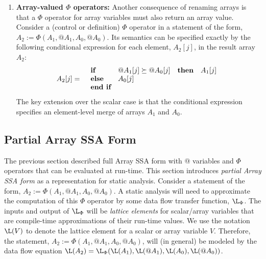 \begin{enumerate}
\item {\bf Array-valued  $\Phi$ operators:}
\label{array:phi}
Another consequence of renaming arrays is that
a $\Phi$ operator
for array variables must also return an
array value.  Consider a (control or definition) $\Phi$ operator in
a statement of
the form, $A_2 := \Phi(A_1, @A_1, A_0, @A_0)$. Its semantics can be specified exactly
by the following conditional expression
for each element, $A_2[j]$, in the result array $A_2$:
\begin{eqnarray}
A_2[j] & = &
  \begin{array}{llll}
\mbox{\bf if} & @A_1[j] \succeq @A_0[j] & {\bf then} & A_1[j] \\
\mbox{\bf else} & A_0[j] \\
\mbox{\bf end if} \label{eqn:cond-expr}
  \end{array}
\end{eqnarray}
The key extension over the scalar case is that the conditional expression
specifies an element-level merge of arrays $A_1$ and $A_0$.
\end{enumerate}




\subsection{Partial Array SSA Form}\label{sec:partial}

The previous section described full Array SSA form with @ variables
and $\Phi$ operators that can be evaluated at run-time.
This section introduces {\it partial Array SSA form}
as a  representation for static analysis.  
Consider a statement of the form, $A_2 := \Phi(A_1, @A_1, A_0, @A_0)$.
A static analysis will need to 
approximate
the computation of this $\Phi$ operator by 
some data flow transfer function, $\L_{\Phi}$.
The inputs and output of $\L_{\Phi}$ will be
{\it lattice elements} for scalar/array variables that
are compile-time approximations of their run-time values.
We use the notation $\L(V)$ to denote the lattice element for 
a scalar or array
variable $V$.
Therefore, the 
statement, $A_2 := \Phi(A_1, @A_1, A_0, @A_0)$, will (in general)
be modeled by the data flow equation 
$\L(A_2) = \L_{\Phi}(\L(A_1), \L(@A_1), \L(A_0), \L(@A_0))$.

